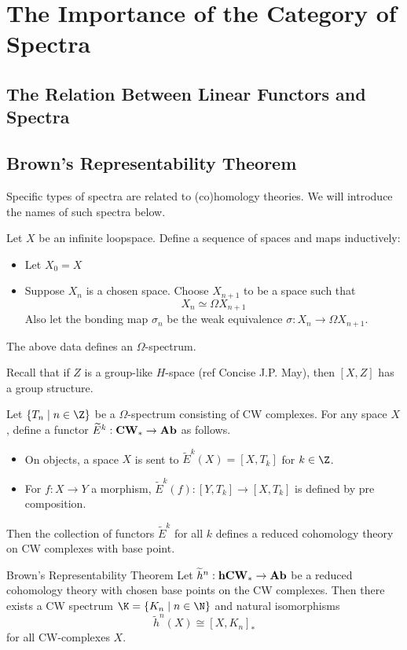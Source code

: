 \documentclass[a4paper]{article}
\begin{document}
\pagebreak
\section{The Importance of the Category of Spectra}
\subsection{The Relation Between Linear Functors and Spectra}
\subsection{Brown's Representability Theorem}
Specific types of spectra are related to (co)homology theories. We will introduce the names of such spectra below. 

\begin{lmm}{}{} Let $X$ be an infinite loopspace. Define a sequence of spaces and maps inductively:
\begin{itemize}
\item Let $X_0=X$
\item Suppose $X_n$ is a chosen space. Choose $X_{n+1}$ to be a space such that $$X_n\simeq\Omega X_{n+1}$$ Also let the bonding map $\sigma_n$ be the weak equivalence $\sigma:X_n\to\Omega X_{n+1}$. 
\end{itemize}
The above data defines an $\Omega$-spectrum. 
\end{lmm}

Recall that if $Z$ is a group-like $H$-space (ref Concise J.P. May), then $[X,Z]$ has a group structure. 

\begin{thm}{}{} Let $\{T_n\;|\;n\in\Z\}$ be a $\Omega$-spectrum consisting of CW complexes. For any space $X$, define a functor $\widetilde{E}^k:\bold{CW}_\ast\to\bold{Ab}$ as follows. 
\begin{itemize}
\item On objects, a space $X$ is sent to $\widetilde{E}^k(X)=[X,T_k]$ for $k\in\Z$.
\item For $f:X\to Y$ a morphism, $\widetilde{E}^k(f):[Y,T_k]\to[X,T_k]$ is defined by pre composition.
\end{itemize}
Then the collection of functors $\widetilde{E}^k$ for all $k$ defines a reduced cohomology theory on CW complexes with base point. 
\end{thm}

\begin{thm}{Brown's Representability Theorem}{} Let $\widetilde{h}^n:\bold{hCW}_\ast\to\bold{Ab}$ be a reduced cohomology theory with chosen base points on the CW complexes. Then there exists a CW spectrum $\K=\{K_n\;|\;n\in\N\}$ and natural isomorphisms $$\widetilde{h}^n(X)\cong[X,K_n]_\ast$$ for all CW-complexes $X$. 
\end{thm}
\end{document}
